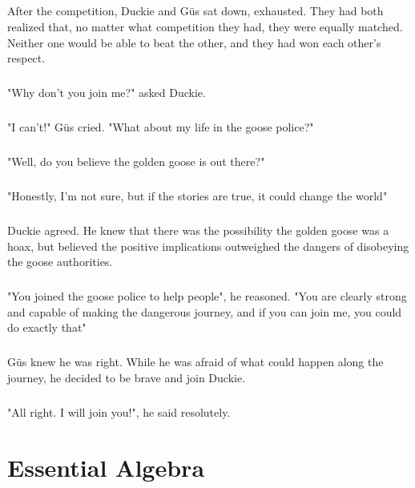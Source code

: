 \documentclass[a4paper,11pt ]{book}
\begin{document}
\paragraph{} After the competition, Duckie and Güs sat down, exhausted. They had both realized that, no matter what competition they had, they were equally matched. Neither one would be able to beat the other, and they had won each other's respect. 
\paragraph{} "Why don't you join me?" asked Duckie.
\paragraph{} "I can't!" Güs cried. "What about my life in the goose police?"
\paragraph{} "Well, do you believe the golden goose is out there?"
\paragraph{} "Honestly, I'm not sure, but if the stories are true, it could change the world"
\paragraph{} Duckie agreed. He knew that there was the possibility the golden goose was a hoax, but believed the positive implications outweighed the dangers of disobeying the goose authorities. 
\paragraph{} "You joined the goose police to help people", he reasoned. "You are clearly strong and capable of making the dangerous journey, and if you can join me, you could do exactly that"
\paragraph{} Güs knew he was right. While he was afraid of what could happen along the journey, he decided to be brave and join Duckie. 
\paragraph{} "All right. I will join you!", he said resolutely. 
\chapter{Essential Algebra}
\end{document}
